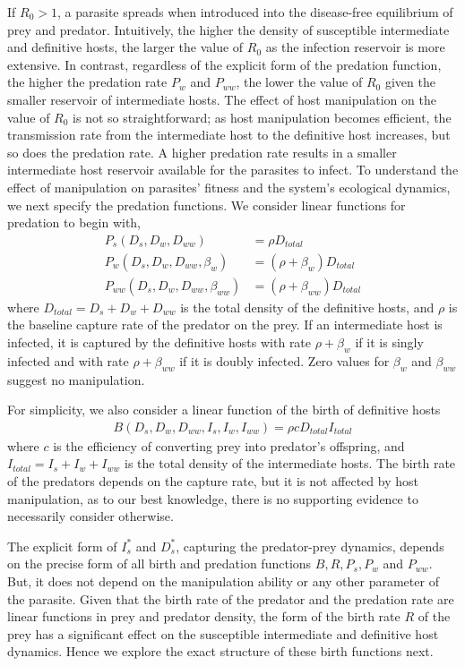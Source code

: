 \documentclass[11pt]{article}
\begin{document}
If $R_0 > 1$, a parasite spreads when introduced into the disease-free equilibrium of prey and predator.
Intuitively, the higher the density of susceptible intermediate and definitive hosts, the larger the value of $R_0$ as the infection reservoir is more extensive. 
In contrast, regardless of the explicit form of the predation function, the higher the predation rate $P_w$ and $P_{ww}$, the lower the value of $R_0$ given the smaller reservoir of intermediate hosts. 
The effect of host manipulation on the value of $R_0$ is not so straightforward; as host manipulation becomes efficient, the transmission rate from the intermediate host to the definitive host increases, but so does the predation rate. 
A higher predation rate results in a smaller intermediate host reservoir available for the parasites to infect. 
To understand the effect of manipulation on parasites' fitness and the system's ecological dynamics, we next specify the predation functions. 
We consider linear functions for predation to begin with,
%
\begin{align*}
 P_s(D_s, D_w, D_{ww}) &= \rho D_{total}  \\
 P_w(D_s, D_w, D_{ww}, \beta_w) &= (\rho + \beta_w) D_{total} \\
 P_{ww}(D_s, D_w, D_{ww}, \beta_{ww}) &=  (\rho + \beta_{ww})D_{total}
\end{align*}
%
where $D_{total} = D_s + D_w + D_{ww}$ is the total density of the definitive hosts, and $\rho$ is the baseline capture rate of the predator on the prey. 
If an intermediate host is infected, it is captured by the definitive hosts with rate $\rho + \beta_w$ if it is singly infected and with rate $\rho + \beta_{ww}$ if it is doubly infected. 
Zero values for $\beta_w$ and $\beta_{ww}$ suggest no manipulation.

For simplicity, we also consider a linear function of the birth of definitive hosts
%
\begin{align*}
B(D_s, D_w, D_{ww}, I_s, I_w, I_{ww}) = \rho c D_{total} I_{total}
\end{align*}
%
where $c$ is the efficiency of converting prey into predator's offspring, and $I_{total} = I_s + I_w + I_{ww}$ is the total density of the intermediate hosts.
The birth rate of the predators depends on the capture rate, but it is not affected by host manipulation, as to our best knowledge, there is no supporting evidence to necessarily consider otherwise.

The explicit form of $I_s^*$ and $D_s^*$, capturing the predator-prey dynamics, depends on the precise form of all birth and predation functions $B, R, P_s, P_w$ and $P_{ww}$.
But, it does not depend on the manipulation ability or any other parameter of the parasite. 
Given that the birth rate of the predator and the predation rate are linear functions in prey and predator density, the form of the birth rate $R$ of the prey has a significant effect on the susceptible intermediate and definitive host dynamics.
Hence we explore the exact structure of these birth functions next.
\end{document}
